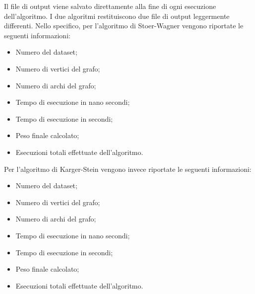 Il file di output viene salvato direttamente alla fine di ogni esecuzione dell'algoritmo. I due algoritmi restituiscono due file di output leggermente differenti. Nello specifico, per l'algoritmo di Stoer-Wagner vengono riportate le seguenti informazioni:

\begin{itemize}
    \item Numero del dataset;
    \item Numero di vertici del grafo;
    \item Numero di archi del grafo;
    \item Tempo di esecuzione in nano secondi;
    \item Tempo di esecuzione in secondi;
    \item Peso finale calcolato;
    \item Esecuzioni totali effettuate dell'algoritmo.
\end{itemize}

Per l'algoritmo di Karger-Stein vengono invece riportate le seguenti informazioni:

\begin{itemize}
  \item Numero del dataset;
  \item Numero di vertici del grafo;
  \item Numero di archi del grafo;
  \item Tempo di esecuzione in nano secondi;
  \item Tempo di esecuzione in secondi;
  \item Peso finale calcolato;
  \item Esecuzioni totali effettuate dell'algoritmo.
\end{itemize}